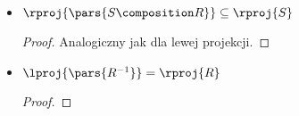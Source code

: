 \begin{description}
\begin{itemize}
\begin{proof}
\begin{equation*}
\begin{split}
					            \iff     & a \in A \land \exists_{c \in C}\exists_{b \in B} \pars{\pars{a, b} \in R \land \pars{b, c} \in S}                                 \\
					            \implies & a \in A \land \exists_{c \in C}\pars{\pars{\exists_{b \in B} \pars{a, b} \in R} \land \pars{\exists_{b \in B} \pars{b, c} \in S}} \\
					            \implies & a \in A \land \exists_{c \in C}\pars{\exists_{b \in B} \pars{a, b} \in R}                                                         \\
					            \implies & a \in A \land \exists_{b \in B} \pars{a, b} \in R                                                                                 \\
					            \iff     & a \in \lproj{R}
				            \end{split}
			            \end{equation*}
			            Warto zauważyć, że trzy z~powyższych przejść są tylko implikacjami (bo zapominamy na przykład o~pewnych członach konjunkcji) i~nie jest to przypadek. Istotnie, zachodzi tylko inkluzja w~podaną stronę. Aby się o~tym przekonać możemy przyjąć
			            \begin{align*}
				            A & = \set{a}                                \\
				            B & = \set{b}                                \\
				            C & = \set{c}                                \\
				            R & = \set{\pars{a, b}} \subseteq A \times B \\
				            S & = \emptyset \subseteq B \times C
			            \end{align*}
			            Wtedy \(S \composition R = \emptyset\), zatem również \(\lproj{\pars{S \composition R}} = \emptyset\). Natomiast \(\lproj{R} = \set{a}\), więc istotnie zachodzi dowiedziona inkluzja (byłby przypał, gdyby było inaczej), ale nie ma równości.
		            \end{proof}
		      \item \(\rproj{\pars{S \composition R}} \subseteq \rproj{S}\)
		            \begin{proof}
			            Analogiczny jak dla lewej projekcji.
		            \end{proof}
		      \item \(\lproj{\pars{R^{-1}}} = \rproj{R}\)
		            \begin{proof}

\end{proof}
\end{itemize}
\end{description}
